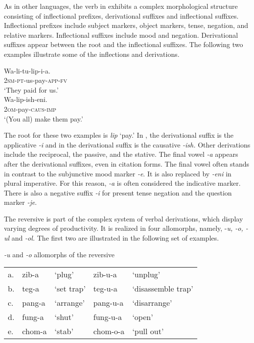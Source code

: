 \documentclass[output=paper]{langsci/langscibook}
\begin{document}
As in other  languages, the verb in  exhibits a complex morphological structure consisting of inflectional prefixes, derivational suffixes and inflectional suffixes. Inflectional prefixes include subject markers, object markers, tense, negation, and relative markers. Inflectional suffixes include mood and negation. Derivational suffixes appear between the root and the inflectional suffixes. The following two examples illustrate some of the inflections and derivations.

\ea\label{ex:ngonyaningowa:2}
\ea\label{ex:ngonyaningowa:2a}
\gll Wa-li-tu-lip-i-a. \\
  2\textsc{sm}-\textsc{pt}-us-pay-\textsc{app}-\textsc{fv} \\
\glt  ‘They paid for us.’ \\

\ex\label{ex:ngonyaningowa:2b}  
\gll Wa-lip-ish-eni. \\
  2\textsc{om}-pay-\textsc{caus}-\textsc{imp} \\
\glt  ‘(You all) make them pay.’ 
\z
\z 

The root for these two examples is \textit{lip} ‘pay.’ In , the derivational suffix is the applicative \textit{-i} and in  the derivational suffix is the causative \textit{-ish.} Other derivations include the reciprocal, the passive, and the stative. The final vowel \textit{-a} appears after the derivational suffixes, even in citation forms. The final vowel often stands in contrast to the subjunctive mood marker \textit{-e}. It is also replaced by \textit{-eni} in plural imperative. For this reason, \textit{-a} is often considered the indicative marker. There is also a negative suffix \textit{-i} for present tense negation and the question marker \textit{-je}.

The reversive is part of the complex system of verbal derivations, which display varying degrees of productivity. It is realized in four allomorphs, namely, -\textit{u, -o, -ul} and \textit{-ol.} The first two are illustrated in the following set of examples.

\ea\label{ex:ngonyaningowa:3} {\textit{-u} and \textit{-o} allomorphs of the reversive}
\begin{tabularx}{\textwidth}{lllll}
a.\label{ex:ngonyaningowa:3a}& {zib-a} & {‘plug’} & {zib-u-a} & {‘unplug’} \\
b.\label{ex:ngonyaningowa:3b}& {teg-a} & {‘set trap’}& {teg-u-a} & {‘disassemble trap’}\\
c.\label{ex:ngonyaningowa:3c} & {pang-a} & {‘arrange’}& {pang-u-a}  & {‘disarrange’} \\
d.\label{ex:ngonyaningowa:3d} & {fung-a} & {‘shut’} & {fung-u-a}  & {‘open’}\\
e.\label{ex:ngonyaningowa:3e} & {chom-a} & {‘stab’} & {chom-o-a}  & {‘pull out’}
\end{tabularx}
\z
\end{document}
